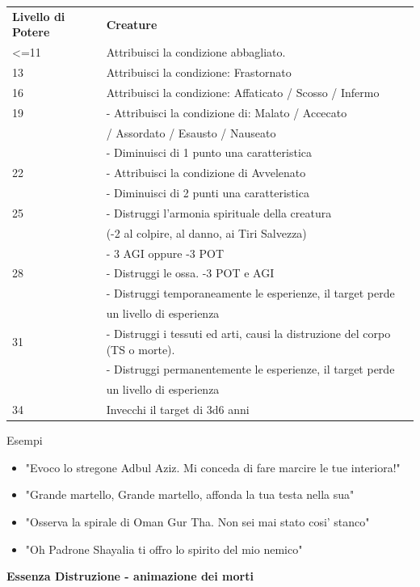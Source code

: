 \documentclass[a4paper,11pt,twoside,openany]{book}
\begin{document}
\bigskip

\begin{tabular}{L{3cm} L{13cm}}
\toprule 
\textbf{Livello di Potere} & \textbf{Creature}\tabularnewline
<=11 &Attribuisci la condizione abbagliato. \\
13 & Attribuisci la condizione: Frastornato\\
16 & Attribuisci la condizione: Affaticato / Scosso / Infermo\\
19 & - Attribuisci la condizione di: Malato / Accecato\\
& / Assordato / Esausto / Nauseato\\
& - Diminuisci di 1 punto una caratteristica\\
22 & - Attribuisci la condizione di Avvelenato\\
& - Diminuisci di 2 punti una caratteristica\\
25 & - Distruggi l’armonia spirituale della creatura \\
&(-2 al colpire, al danno, ai Tiri Salvezza)\\
& - 3 AGI oppure -3 POT\\
28 & - Distruggi le ossa. -3 POT e AGI\\
& - Distruggi temporaneamente le esperienze, il target perde\\
& un livello di esperienza\\
31& - Distruggi i tessuti ed arti, causi la distruzione del corpo (TS o morte).\\
& - Distruggi permanentemente le esperienze, il target perde\\
&un livello di esperienza\\
34 &Invecchi il target di 3d6 anni\\
\end{tabular}

\bigskip

Esempi
\begin{itemize}
\item 
"Evoco lo stregone Adbul Aziz. Mi conceda di fare marcire le tue interiora!" 
\item 
"Grande martello, Grande martello, affonda la tua testa nella sua" 
\item 
"Osserva la spirale di Oman Gur Tha. Non sei mai stato cosi' stanco"
\item 
"Oh Padrone Shayalia ti offro lo spirito del mio nemico" 
\end{itemize}

\bigskip

\textbf{Essenza Distruzione - animazione dei morti}
\end{document}

